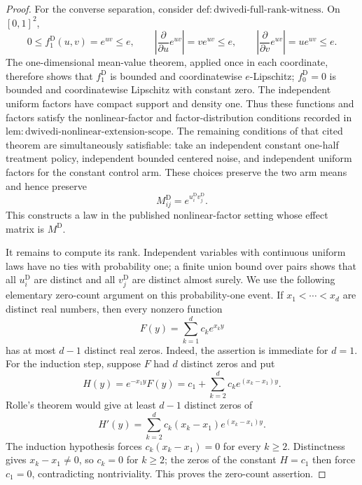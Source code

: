 \documentclass{article}
\begin{document}
\begin{proof}
For the converse separation, consider \(\mathrm{def:dwivedi\mbox{-}full\mbox{-}rank\mbox{-}witness}\).  On \([0,1]^2\),
\[
 0\le f^{\mathrm D}_1(u,v)=e^{uv}\le e,
 \qquad
 \left|\frac{\partial}{\partial u}e^{uv}\right|=ve^{uv}\le e,
 \qquad
 \left|\frac{\partial}{\partial v}e^{uv}\right|=ue^{uv}\le e.
\]
The one-dimensional mean-value theorem, applied once in each coordinate, therefore shows that \(f^{\mathrm D}_1\) is bounded and coordinatewise \(e\)-Lipschitz; \(f^{\mathrm D}_0=0\) is bounded and coordinatewise Lipschitz with constant zero.  The independent uniform factors have compact support and density one.  Thus these functions and factors satisfy the nonlinear-factor and factor-distribution conditions recorded in \(\mathrm{lem:dwivedi\mbox{-}nonlinear\mbox{-}extension\mbox{-}scope}\).  The remaining conditions of that cited theorem are simultaneously satisfiable: take an independent constant one-half treatment policy, independent bounded centered noise, and independent uniform factors for the constant control arm.  These choices preserve the two arm means and hence preserve
\[
 M^{\mathrm D}_{ij}=e^{u_i^{\mathrm D}v_j^{\mathrm D}}.
\]
This constructs a law in the published nonlinear-factor setting whose effect matrix is \(M^{\mathrm D}\).

It remains to compute its rank.  Independent variables with continuous uniform laws have no ties with probability one; a finite union bound over pairs shows that all \(u_i^{\mathrm D}\) are distinct and all \(v_j^{\mathrm D}\) are distinct almost surely.  We use the following elementary zero-count argument on this probability-one event.  If \(x_1<\cdots<x_d\) are distinct real numbers, then every nonzero function
\[
 F(y)=\sum_{k=1}^d c_k e^{x_k y}
\]
has at most \(d-1\) distinct real zeros.  Indeed, the assertion is immediate for \(d=1\).  For the induction step, suppose \(F\) had \(d\) distinct zeros and put
\[
 H(y)=e^{-x_1y}F(y)=c_1+\sum_{k=2}^d c_k e^{(x_k-x_1)y}.
\]
Rolle's theorem would give at least \(d-1\) distinct zeros of
\[
 H'(y)=\sum_{k=2}^d c_k(x_k-x_1)e^{(x_k-x_1)y}.
\]
The induction hypothesis forces \(c_k(x_k-x_1)=0\) for every \(k\ge2\).  Distinctness gives \(x_k-x_1\ne0\), so \(c_k=0\) for \(k\ge2\); the zeros of the constant \(H=c_1\) then force \(c_1=0\), contradicting nontriviality.  This proves the zero-count assertion.


\end{proof}
\end{document}
